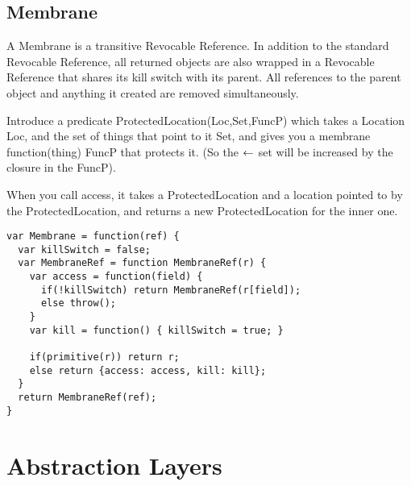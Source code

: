 \documentclass[a4paper]{article}
\begin{document}

\subsection{Membrane}
\label{sec:membrane}
A Membrane is a transitive Revocable Reference. In addition to the standard
Revocable Reference, all returned objects are also wrapped in a Revocable
Reference that shares its kill switch with its parent. All references to the
parent object and anything it created are removed simultaneously.

Introduce a predicate ProtectedLocation(Loc,Set,FuncP) which takes a
Location Loc, and the set of things that point to it Set, and gives you a
membrane function(thing) FuncP that protects it. (So the $\leftarrow$ set will be
increased by the closure in the FuncP).

When you call access, it takes a ProtectedLocation and a location pointed to
by the ProtectedLocation, and returns a new ProtectedLocation for the inner
one.
\begin{verbatim}
var Membrane = function(ref) {
  var killSwitch = false;
  var MembraneRef = function MembraneRef(r) {
    var access = function(field) {
      if(!killSwitch) return MembraneRef(r[field]);
      else throw();
    }
    var kill = function() { killSwitch = true; }

    if(primitive(r)) return r;
    else return {access: access, kill: kill};
  }
  return MembraneRef(ref);
}
\end{verbatim}

\section{Abstraction Layers}
\end{document}
